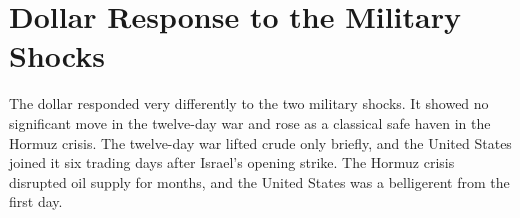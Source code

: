 \begin{figure}[htbp]
  \label{fig:car_liberation_day}
\end{figure}




\section{Dollar Response to the Military Shocks}
\label{sec:es_iran}

The dollar responded very differently to the two military shocks. It showed no significant move in the twelve-day war and rose as a classical safe haven in the Hormuz crisis. The twelve-day war lifted crude only briefly, and the United States joined it six trading days after Israel's opening strike. The Hormuz crisis disrupted oil supply for months, and the United States was a belligerent from the first day.

